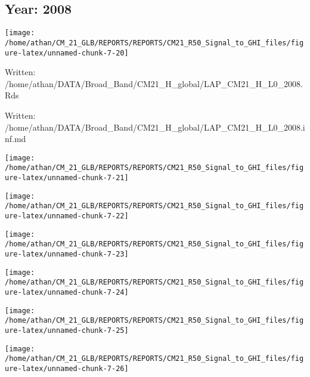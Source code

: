 \documentclass[
  11pt,
  a4paper,oneside]{article}
\begin{document}
\FloatBarrier

\newpage

\hypertarget{year-2008}{%
\subsection{Year: 2008}\label{year-2008}}

\begin{center}\texttt{[image: /home/athan/CM\_21\_GLB/REPORTS/REPORTS/CM21\_R50\_Signal\_to\_GHI\_files/figure-latex/unnamed-chunk-7-20]} \end{center}

Written: /home/athan/DATA/Broad\_Band/CM21\_H\_global/LAP\_CM21\_H\_L0\_2008.Rds

Written: /home/athan/DATA/Broad\_Band/CM21\_H\_global/LAP\_CM21\_H\_L0\_2008.inf.md

\begin{center}\texttt{[image: /home/athan/CM\_21\_GLB/REPORTS/REPORTS/CM21\_R50\_Signal\_to\_GHI\_files/figure-latex/unnamed-chunk-7-21]} \end{center}

\begin{center}\texttt{[image: /home/athan/CM\_21\_GLB/REPORTS/REPORTS/CM21\_R50\_Signal\_to\_GHI\_files/figure-latex/unnamed-chunk-7-22]} \end{center}

\begin{center}\texttt{[image: /home/athan/CM\_21\_GLB/REPORTS/REPORTS/CM21\_R50\_Signal\_to\_GHI\_files/figure-latex/unnamed-chunk-7-23]} \end{center}

\begin{center}\texttt{[image: /home/athan/CM\_21\_GLB/REPORTS/REPORTS/CM21\_R50\_Signal\_to\_GHI\_files/figure-latex/unnamed-chunk-7-24]} \end{center}

\begin{center}\texttt{[image: /home/athan/CM\_21\_GLB/REPORTS/REPORTS/CM21\_R50\_Signal\_to\_GHI\_files/figure-latex/unnamed-chunk-7-25]} \end{center}

\begin{center}\texttt{[image: /home/athan/CM\_21\_GLB/REPORTS/REPORTS/CM21\_R50\_Signal\_to\_GHI\_files/figure-latex/unnamed-chunk-7-26]} \end{center}
\end{document}
